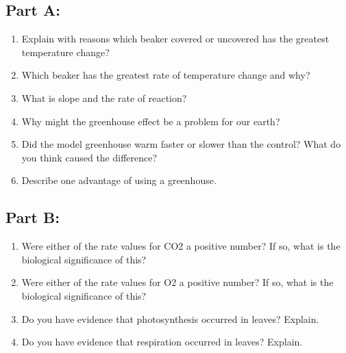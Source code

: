 \documentclass[a4paper, 12pt, english]{article}
\begin{document}
\subsection{Part A:}

\begin{enumerate}
    \item Explain with reasons which beaker covered or uncovered has the greatest temperature change?
    \item Which beaker has the greatest rate of temperature change and why?
    \item What is slope and the rate of reaction?
    \item Why might the greenhouse effect be a problem for our earth?
    \item Did the model greenhouse warm faster or slower than the control? What do you think caused the difference?
    \item Describe one advantage of using a greenhouse.
\end{enumerate}

\subsection{Part B:}

\begin{enumerate}
    \item Were either of the rate values for CO2 a positive number? If so, what is the biological significance of this?
    \item Were either of the rate values for O2 a positive number? If so, what is the biological significance of this?
    \item Do you have evidence that photosynthesis occurred in leaves? Explain.
    \item Do you have evidence that respiration occurred in leaves? Explain.
\end{enumerate}
\end{document}
